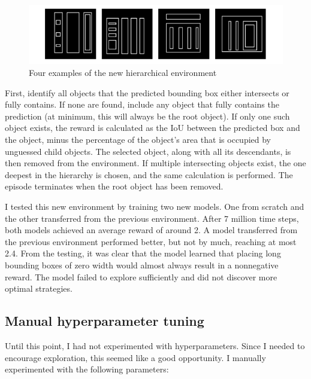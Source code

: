 \documentclass[
  digital,     %
  oneside,     %
  nosansbold,  %
  nocolorbold, %
  lof,         %
  lot,         %
]{fithesis4}
\begin{document}
\begin{figure}
    \centering
    \includegraphics[width=1\linewidth]{env_examples/env7.pdf}
    \caption{Four examples of the new hierarchical environment}
    \label{fig:env7}
\end{figure}

First, identify all objects that the predicted bounding box either intersects or fully contains. If none are found, include any object that fully contains the prediction (at minimum, this will always be the root object). If only one such object exists, the reward is calculated as the IoU between the predicted box and the object, minus the percentage of the object’s area that is occupied by unguessed child objects. The selected object, along with all its descendants, is then removed from the environment. If multiple intersecting objects exist, the one deepest in the hierarchy is chosen, and the same calculation is performed. The episode terminates when the root object has been removed.

I tested this new environment by training two new models. One from scratch and the other transferred from the previous environment. After 7 million time steps, both models achieved an average reward of around 2. A model transferred from the previous environment performed better, but not by much, reaching at most 2.4. From the testing, it was clear that the model learned that placing long bounding boxes of zero width would almost always result in a nonnegative reward. The model failed to explore sufficiently and did not discover more optimal strategies.

\subsection{Manual hyperparameter tuning}

Until this point, I had not experimented with hyperparameters. Since I needed to encourage exploration, this seemed like a good opportunity. I manually experimented with the following parameters:
\end{document}
